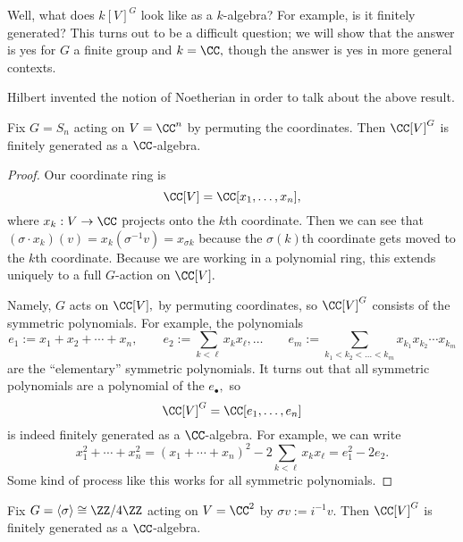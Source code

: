 Well, what does $k[V]^G$ look like as a $k$-algebra? For example, is it finitely generated? This turns out to be a difficult question; we will show that the answer is yes for $G$ a finite group and $k=\CC,$ though the answer is yes in more general contexts.
\begin{remark}
	Hilbert invented the notion of Noetherian in order to talk about the above result.
\end{remark}
\begin{exercise}
	Fix $G=S_n$ acting on $V=\CC^n$ by permuting the coordinates. Then $\CC[V]^G$ is finitely generated as a $\CC$-algebra.
\end{exercise}
\begin{proof}
	Our coordinate ring is
	\[\CC[V]=\CC[x_1,\ldots,x_n],\]
	where $x_k:V\to\CC$ projects onto the $k$th coordinate. Then we can see that $(\sigma\cdot x_k)(v)=x_k(\sigma^{-1}v)=x_{\sigma k}$ because the $\sigma(k)$th coordinate gets moved to the $k$th coordinate. Because we are working in a polynomial ring, this extends uniquely to a full $G$-action on $\CC[V].$
	
	Namely, $G$ acts on $\CC[V],$ by permuting coordinates, so $\CC[V]^G$ consists of the symmetric polynomials. For example, the polynomials
	\[e_1:=x_1+x_2+\cdots+x_n,\qquad e_2:=\sum_{k<\ell}x_kx_\ell,\ldots\qquad e_m:=\sum_{k_1<k_2<\ldots<k_m}x_{k_1}x_{k_2}\cdots x_{k_m}\]
	are the ``elementary'' symmetric polynomials. It turns out that all symmetric polynomials are a polynomial of the $e_\bullet,$ so
	\[\CC[V]^G=\CC[e_1,\ldots,e_n]\]
	is indeed finitely generated as a $\CC$-algebra. For example, we can write
	\[x_1^2+\cdots+x_n^2=(x_1+\cdots+x_n)^2-2\sum_{k<\ell}x_kx_\ell=e_1^2-2e_2.\]
	Some kind of process like this works for all symmetric polynomials.
\end{proof}
\begin{exercise}
	Fix $G=\langle\sigma\rangle\cong\ZZ/4\ZZ$ acting on $V=\CC^2$ by $\sigma v:=i^{-1}v.$ Then $\CC[V]^G$ is finitely generated as a $\CC$-algebra.
\end{exercise}
